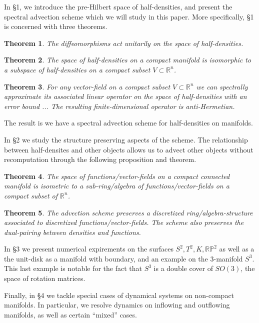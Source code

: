 \documentclass[12pt]{amsart}
\newtheorem{thm}{Theorem}
\begin{document}
In \S 1, we introduce the pre-Hilbert space of half-densities,
and present the spectral advection scheme which we will study in this paper.
More specifically, \S 1 is concerned with three theorems.

\begin{thm}
  The diffeomorphisms act unitarily on the space of half-densities.
\end{thm}

\begin{thm}
  The space of half-densities on a compact manifold is isomorphic
  to a subspace of half-densities on a compact subset $V \subset \mathbb{R}^n$.
\end{thm}

\begin{thm}
  For any vector-field on a compact subset $V \subset \mathbb{R}^n$
  we can spectrally approximate its associated linear operator
  on the space of half-densities with an error bound ...
  The resulting finite-dimensional operator is anti-Hermetian.
\end{thm}

The result is we have a spectral advection scheme for half-densities
on manifolds.

In \S 2 we study the structure preserving aspects of the scheme.
The relationship between half-densites and other objects
allows us to advect other objects without recomputation through the following proposition and theorem.

\begin{thm}
  The space of functions/vector-fields
  on a compact connected manifold
  is isometric to a sub-ring/algebra of 
  functions/vector-fields on a compact subset
  of $\mathbb{R}^n$.
\end{thm}

\begin{thm}
  The advection scheme preserves a discretized
  ring/algebra-structure associated to discretized functions/vector-fields.
  The scheme also preserves the dual-pairing between densities and functions.
\end{thm}

In \S 3 we present numerical expirements on the surfaces $S^2,T^2,K,\mathbb{RP}^2$ as well as a the unit-disk as a manifold with boundary, and an example on the 3-manifold $S^3$.
This last example is notable for the fact that $S^3$ is a double cover of $SO(3)$, the space of rotation matrices.

Finally, in \S 4 we tackle special cases of dynamical systems on non-compact manifolds.
In particular, we resolve dynamics on inflowing and outflowing manifolds, as well as certain ``mixed'' cases.
\end{document}
